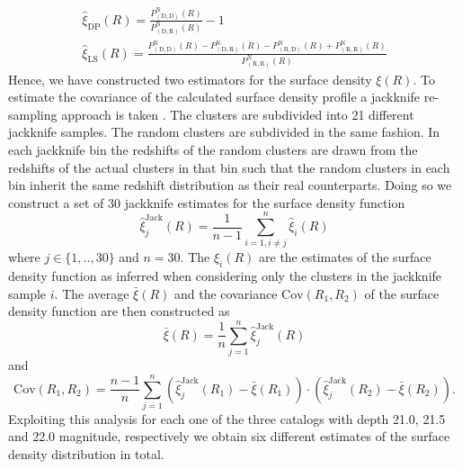 \documentclass[a4paper,fleqn,usenatbib]{mnras}
\newcommand{\fhat}[1]{\expandafter\hat#1}
\newcommand{\fbar}[1]{\expandafter\bar#1}
\begin{document}
\begin{align}
\fhat{\xi_{\mathrm{DP}}(R)}=\frac{P^{\mathrm{N}}_{\mathrm{(D,D)}}(R)}{P^{\mathrm{N}}_{\mathrm{(D,R)}}(R)}-1\\
\fhat{\xi_{\mathrm{LS}}(R)}=\frac{P^{\mathrm{N}}_{\mathrm{(D,D)}}(R)-P^{\mathrm{N}}_{\mathrm{(D,R)}}(R)-P^{\mathrm{N}}_{\mathrm{(R,D)}}(R)+P^{\mathrm{N}}_{\mathrm{(R,R)}}(R)}{P^{\mathrm{N}}_{\mathrm{(R,R)}}(R)}
\end{align}
Hence, we have constructed two estimators for the surface density $\xi(R)$. To estimate the covariance of the calculated surface density profile a jackknife re-sampling approach is taken \citep{efron1982jackknife}. The clusters are subdivided into 21 different jackknife samples. The random clusters are subdivided in the same fashion. In each jackknife bin the redshifts of the random clusters are drawn from the redshifts of the actual clusters in that bin such that the random clusters in each bin inherit the same redshift distribution as their real counterparts. Doing so we construct a set of 30 jackknife estimates for the surface density function
\begin{equation}
\fhat{\xi^{\mathrm{Jack}}_j (R)}=\frac{1}{n-1}\sum^n_{i=1,i\neq j} \fhat{\xi_i (R)}
\end{equation}
where $j \in \{1,..,30\}$ and $n=30$. The $\fhat{\xi_i (R)}$ are the estimates of the surface density function as inferred when considering only the clusters in the jackknife sample $i$. The average $\fbar{\xi(R)}$ and the covariance $\mathrm{Cov}(R_1,R_2)$ of the surface density function are then constructed as
\begin{equation}
\fbar{\xi(R)}=\frac{1}{n}\sum_{j=1}^n \fhat{\xi^{\mathrm{Jack}}_j (R)}
\end{equation}
and 
\begin{equation}
\mathrm{Cov}(R_1,R_2)=\frac{n-1}{n}\sum_{j=1}^n (\fhat{\xi^{\mathrm{Jack}}_j (R_1)} - \fbar{\xi(R_1)}) \cdot (\fhat{\xi^{\mathrm{Jack}}_j (R_2)} - \fbar{\xi(R_2)}).
\end{equation}
Exploiting this analysis for each one of the three catalogs with depth 21.0, 21.5 and 22.0 magnitude, respectively we obtain six different estimates of the surface density distribution in total.
\end{document}
